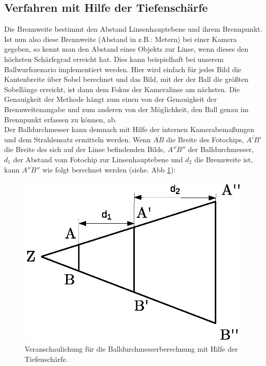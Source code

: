 \documentclass{ezb}
\begin{document}
\subsection{Verfahren mit Hilfe der Tiefenschärfe}
Die Brennweite bestimmt den Abstand Linsenhauptebene und ihrem Brennpunkt. Ist nun also diese Brennweite (Abstand in z.B.: Metern) bei einer Kamera gegeben, so kennt man den Abstand eines Objekts zur Linse, wenn dieses den höchsten Schärfegrad erreicht hat. Dies kann beispielhaft bei unserem Ballwurfszenario implementiert werden. Hier wird einfach für jedes Bild die Kantenbreite über Sobel berechnet und das Bild, mit der der Ball die größten Sobellänge erreicht, ist dann dem Fokus der Kameralinse am nächsten. Die Genauigkeit der Methode hängt zum einen von der Genauigkeit der Brennweitenangabe und zum anderen von der Möglichkeit, den Ball genau im Brennpunkt erfassen zu können, ab.\\
\linebreak
Der Balldurchmesser kann demnach mit Hilfe der internen Kamerabemaßungen und dem Strahlensatz ermitteln werden. Wenn $\overline{AB}$ die Breite des Fotochips, $\overline{A'B'}$ die Breite des sich auf der Linse befindenden Bilds, $\overline{A''B''}$ der Balldurchmesser, $d_{1}$ der Abstand vom Fotochip zur Linsenhauptebene und $d_{2}$ die Brennweite ist, kann $\overline{A''B''}$  wie folgt berechnet werden (siehe. Abb \ref{abb:Strahlensatz}):\\
\linebreak
\begin{figure}[!h]
\centering
\includegraphics[scale=0.6]{./Strahlensatz.eps}
\caption{Veranschaulichung für die Balldurchmesserberechnung mit Hilfe der Tiefenschärfe.}
\label{abb:Strahlensatz}
\end{figure}
\end{document}
